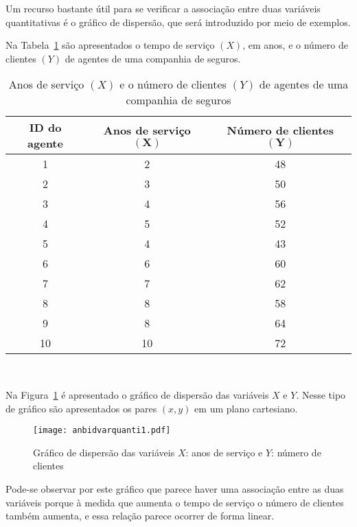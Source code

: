 \documentclass[11pt,fleqn]{book} %
\begin{document}
Um recurso bastante útil para se verificar a associação entre duas variáveis quantitativas é o gráfico de dispersão, que será introduzido por meio de exemplos. \\

\begin{example}\label{exemp:anbidvarquanti1}

Na Tabela~\ref{tab:anbidvarquanti1} são apresentados o tempo de serviço $(X)$, em anos, e o número de clientes $(Y)$ de agentes de uma companhia de seguros. \\

\begin{table}[h]
	\caption{Anos de serviço $(X)$ e o número de clientes $(Y)$ de agentes de uma companhia de seguros}
	\label{tab:anbidvarquanti1} 
	\vspace{-0.1cm}
	\centering
	\begin{tabular}{c c c}
	\toprule
	\textbf{ID do agente} & \textbf{Anos de serviço $ \bm{(X)}$} & \textbf{Número de clientes $\bm{(Y)}$} \\
	\midrule
	1 & 2 & 48 \\
	2 & 3 & 50 \\
	3 & 4 & 56 \\
	4 & 5 & 52 \\
	5 & 4 & 43 \\
	6 & 6 & 60 \\
	7 & 7 & 62 \\
	8 & 8 & 58 \\
	9 & 8 & 64 \\
	10 & 10 & 72 \\	
	\bottomrule
	\end{tabular} \\
\end{table}


Na Figura~\ref{fig:anbidvarquanti1} é apresentado o gráfico de dispersão das variáveis $X$ e $Y$. Nesse tipo de gráfico são apresentados os pares $(x,y)$ em um plano cartesiano. \\

\begin{figure}[h!]
\centering\texttt{[image: anbidvarquanti1.pdf]}
\setlength{\abovecaptionskip}{0.5pt}
\caption{Gráfico de dispersão das variáveis $X$: anos de serviço e $Y$: número de clientes}
\label{fig:anbidvarquanti1} %
\vspace{0.5cm}
\end{figure}

Pode-se observar por este gráfico que parece haver uma associação entre as duas variáveis porque à medida que aumenta o tempo de serviço o número de clientes também aumenta, e essa relação parece ocorrer de forma linear. 

\end{example}
\end{document}
